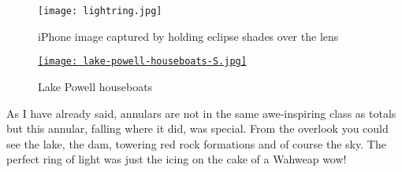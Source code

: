 
\captionsetup[figure]{labelformat=empty}
\begin{figure}[ht]
\centering
\begin{minipage}[b]{0.46\textwidth}
\texttt{[image: lightring.jpg]}\label{fig:2818X2}
\caption{iPhone image captured by holding eclipse shades over the lens}
\end{minipage}
\hspace{8pt}
\begin{minipage}[b]{0.48\textwidth}
\centering
\href{http://conceptcontrol.smugmug.com/Trips/USA-and-Canada/Arizona-Toodling-1/7475075\_MrjqMc}{\texttt{[image: lake-powell-houseboats-S.jpg]}}
\caption{Lake Powell houseboats}
\label{fig:2818X3}
\end{minipage}
\end{figure}

As I have already said, annulars are not in the same awe-inspiring class
as totals but this annular, falling where it did, was special. From the
overlook you could see the lake, the dam, towering red rock formations
and of course the sky. The perfect ring of light was just the icing on
the cake of a Wahweap wow!









%